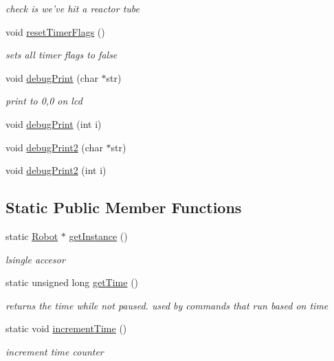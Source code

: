 \begin{DoxyCompactItemize}
\begin{DoxyCompactList}\small\item\em check is we've hit a reactor tube \end{DoxyCompactList}\item 
void \hyperlink{classRobot_ab7c87529c987ede12b934bdfc768507e}{reset\-Timer\-Flags} ()
\begin{DoxyCompactList}\small\item\em sets all timer flags to false \end{DoxyCompactList}\item 
void \hyperlink{classRobot_ac92db8f42fda2c7c70f51abae605039d}{debug\-Print} (char $\ast$str)
\begin{DoxyCompactList}\small\item\em print to 0,0 on lcd \end{DoxyCompactList}\item 
void \hyperlink{classRobot_a99842e804accd91c9b1a246f04a1336b}{debug\-Print} (int i)
\item 
void \hyperlink{classRobot_aeec39516d614f74a4512e1cb0d309f30}{debug\-Print2} (char $\ast$str)
\item 
void \hyperlink{classRobot_a1ab0c3edf15750d4f1cd5de56b1547dd}{debug\-Print2} (int i)
\end{DoxyCompactItemize}
\subsection*{Static Public Member Functions}
\begin{DoxyCompactItemize}
\item 
static \hyperlink{classRobot}{Robot} $\ast$ \hyperlink{classRobot_ac6f19dc31b435f8a2d43944ba49286d0}{get\-Instance} ()
\begin{DoxyCompactList}\small\item\em lsingle accesor \end{DoxyCompactList}\item 
static unsigned long \hyperlink{classRobot_a7fa6a61bffbc8e1e6ba1dd01fd297d63}{get\-Time} ()
\begin{DoxyCompactList}\small\item\em returns the time while not paused. used by commands that run based on time \end{DoxyCompactList}\item 
static void \hyperlink{classRobot_a1e33a376bf08bdbe5ac0d84221d06be9}{increment\-Time} ()
\begin{DoxyCompactList}\small\item\em increment time counter \end{DoxyCompactList}\end{DoxyCompactItemize}
